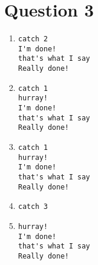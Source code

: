\documentclass[13pt]{article}
\begin{document}
\section*{Question 3}
\begin{enumerate}[label=\alph*)]
\item
\begin{verbatim}
catch 2
I'm done!
that's what I say
Really done!
\end{verbatim}
\item
\begin{verbatim}
catch 1
hurray!
I'm done!
that's what I say
Really done!
\end{verbatim}
\item
\begin{verbatim}
catch 1
hurray!
I'm done!
that's what I say
Really done!
\end{verbatim}
\item
\begin{verbatim}
catch 3
\end{verbatim}
\item
\begin{verbatim}
hurray!
I'm done!
that's what I say
Really done!
\end{verbatim}
\end{enumerate}


\newpage
\end{document}
